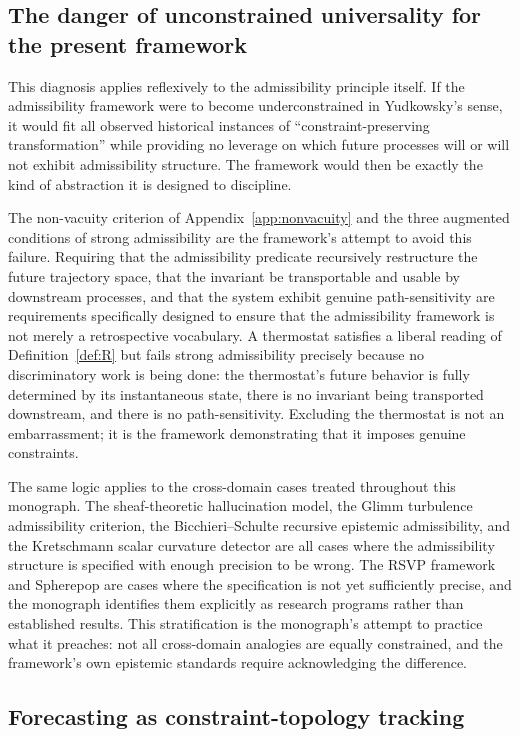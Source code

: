 \documentclass[12pt, a4paper]{article}
\theoremstyle{plain}
\theoremstyle{definition}
\theoremstyle{remark}
\begin{document}
\subsection{The danger of unconstrained universality for the present framework}

This diagnosis applies reflexively to the admissibility principle itself.
If the admissibility framework were to become underconstrained in Yudkowsky's sense,
it would fit all observed historical instances of ``constraint-preserving
transformation'' while providing no leverage on which future processes will or will
not exhibit admissibility structure.
The framework would then be exactly the kind of abstraction it is designed to
discipline.

The non-vacuity criterion of Appendix~\ref{app:nonvacuity} and the three augmented
conditions of strong admissibility are the framework's attempt to avoid this failure.
Requiring that the admissibility predicate recursively restructure the future trajectory
space, that the invariant be transportable and usable by downstream processes, and that
the system exhibit genuine path-sensitivity are requirements specifically designed to
ensure that the admissibility framework is not merely a retrospective vocabulary.
A thermostat satisfies a liberal reading of Definition~\ref{def:R} but fails strong
admissibility precisely because no discriminatory work is being done: the thermostat's
future behavior is fully determined by its instantaneous state, there is no invariant
being transported downstream, and there is no path-sensitivity.
Excluding the thermostat is not an embarrassment; it is the framework demonstrating
that it imposes genuine constraints.

The same logic applies to the cross-domain cases treated throughout this monograph.
The sheaf-theoretic hallucination model, the Glimm turbulence admissibility criterion,
the Bicchieri--Schulte recursive epistemic admissibility, and the Kretschmann scalar
curvature detector are all cases where the admissibility structure is specified with
enough precision to be wrong.
The RSVP framework and Spherepop are cases where the specification is not yet
sufficiently precise, and the monograph identifies them explicitly as research programs
rather than established results.
This stratification is the monograph's attempt to practice what it preaches: not all
cross-domain analogies are equally constrained, and the framework's own epistemic
standards require acknowledging the difference.

\subsection{Forecasting as constraint-topology tracking}
\end{document}
